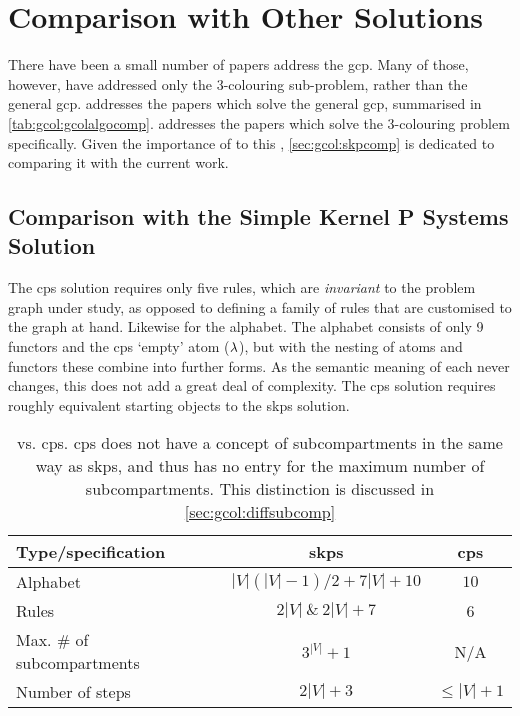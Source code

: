 \section{Comparison with Other  Solutions}

There have been a small number of papers address the \gls{gcp}.  Many of those, however, have addressed only the 3-colouring sub-problem, rather than the general \gls{gcp}.   addresses the papers which solve the general \gls{gcp}, summarised in \cref{tab:gcol:gcolalgocomp}.   addresses the papers which solve the 3-colouring problem specifically.  Given the importance of \cite{Gheorghe2013} to this , \cref{sec:gcol:skpcomp} is dedicated to comparing it with the current work.%

\subsection{\label{sec:gcol:skpcomp}Comparison with the Simple Kernel P Systems Solution}
The \gls{cps} solution requires only five rules, which are \emph{invariant} to the problem graph under study, as opposed to defining a family of rules that are customised to the graph at hand.  Likewise for the alphabet.  The alphabet consists of only 9 \glspl{functor} and the \gls{cps} `empty' atom (\(\lambda\)), but with the nesting of atoms and \glspl{functor} these combine into further forms.  As the semantic meaning of each never changes, this does not add a great deal of complexity.  The \gls{cps} solution requires roughly equivalent starting objects to the \gls{skps} solution.

\begin{table}
\centering
\begin{tabular}{@{}lcc@{}}
\toprule
Type/specification                & \gls{skps}        & \gls{cps} \\ \midrule
Alphabet                          & \(|V|(|V|-1)/2 + 7|V| + 10\) & \(10\)         \\
Rules                             & \(2|V|~\&~2|V| + 7\)       & 6          \\
Max. \# of subcompartments & \(3^|V| + 1\)             & N/A          \\
Number of steps                   & \(2|V| + 3\)             & \(\leq |V| + 1\)         \\ \bottomrule
\end{tabular}%
\caption[ vs. \gls{cps} comparison]{ vs. \gls{cps}.  \gls{cps} does not have a concept of subcompartments in the same way as \gls{skps}, and thus has no entry for the maximum number of subcompartments.  This distinction is discussed in \cref{sec:gcol:diffsubcomp}}
\label{tab:gcol:skpcomp}
\end{table}

